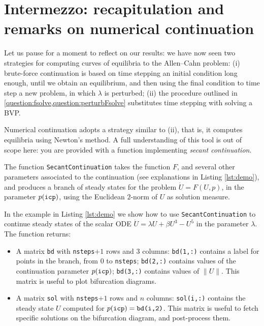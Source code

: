 \documentclass[a4paper]{siamart220329}
\theoremstyle{plain}
\begin{document}
  \section*{Intermezzo: recapitulation and remarks on numerical continuation} Let us
  pause for a moment to reflect on our results: we have now seen two strategies for
  computing curves of equilibria to the Allen--Cahn problem: (i) brute-force continuation
  is based on time stepping an initial condition long enough, until we obtain an
  equilibrium, and then using the final condition to time step a new problem, in
  which $\lambda$ is perturbed; (ii) the procedure outlined in
  \cref{question:fsolve,question:perturbFsolve} substitutes time stepping with
  solving a BVP.

  

  Numerical continuation adopts a strategy similar to (ii), that is, it computes
  equilibria using Newton's method. A full understanding of this tool is out of
  scope here: you are provided with a function implementing \textit{secant
  continuation}.

  The function \lstinline|SecantContinuation| takes the function $F$, and several
  other parameters associated to the continuation (see explanations in Listing
  \ref{lst:demo}), and produces a branch of steady states for the problem $\dot U =
  F(U,p)$, in the parameter $p(\text{\tt icp})$, using the Euclidean $2$-norm of $U$
  as solution measure. 

  In the example in Listing \ref{lst:demo} we show how to use \lstinline|SecantContinuation| to continue
  steady states of the scalar ODE $\dot U = \lambda U + \beta U^3 - U^5$ in the
  parameter $\lambda$.
  The function returns:
  \begin{itemize}
    \item A matrix \lstinline|bd| with \lstinline|nsteps|$+1$ rows and 3 columns:
      \lstinline|bd(1,:)| contains a label for points in the branch, from $0$ to
      \lstinline|nsteps|; \lstinline|bd(2,:)| contains values of the continuation
      parameter $p(\text{\tt icp})$; \lstinline|bd(3,:)| contains values of $\|U\|$.
      This matrix is useful to plot bifurcation diagrams.
    \item A matrix \lstinline|sol| with \lstinline|nsteps|$+1$ rows and $n$ columns:
      \lstinline|sol(i,:)| contains the steady state $U$ computed for $p(\text{\tt
      icp}) = \text{\tt bd(i,2)}$. This matrix is useful to fetch specific solutions
      on the bifurcation diagram, and post-process them.
  \end{itemize}
\end{document}
